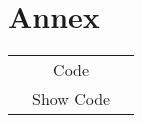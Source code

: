 \documentclass[doc.tex]{subfiles}
\begin{document}
    \section{Annex}

    \begin{tabular}[h]{ccc}
        & Code &  \\
        & Show Code &  \\
    \end{tabular}
\end{document}
